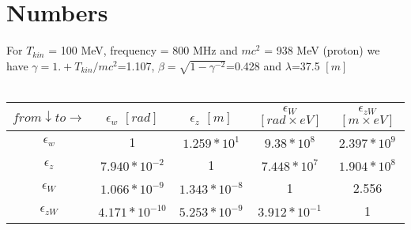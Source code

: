 \documentclass{article}
\begin{document}
\section{Numbers}
For $T_{kin}$ = 100 MeV, frequency  = 800 MHz and $mc^{2}$ = 938 MeV (proton) we have $\gamma = 1.+T_{kin}/mc^{2}$=1.107, $\beta = \sqrt{1-\gamma^{-2}}$=0.428 and $\lambda$=37.5 $[m]$
\ \\ \ \\
\begin{tabular}{|c|c|c|c|c|}
\hline
 $from\downarrow to\rightarrow$ & $\epsilon_{w}$     $[rad]$ & $\epsilon_{z}$     $[m]$ & $\epsilon_{W}$   $[rad\times eV]$ & $\epsilon_{zW}$   $[m\times eV]$   \\
\hline
$\epsilon_{w}$ & 1 & $1.259*10^{1}$ & $9.38*10^{8}$ & $2.397*10^{9}$  \\
$\epsilon_{z}$ & $7.940*10^{-2}$ & 1 & $7.448*10^{7}$ & $1.904*10^{8}$ \\
$\epsilon_{W}$ & $1.066*10^{-9}$ & $1.343*10^{-8}$ &   1 & 2.556  \\
$\epsilon_{zW}$ & $4.171*10^{-10}$ & $5.253*10^{-9}$ & $3.912*10^{-1}$ & 1  \\
\hline
\end{tabular}
\end{document}
